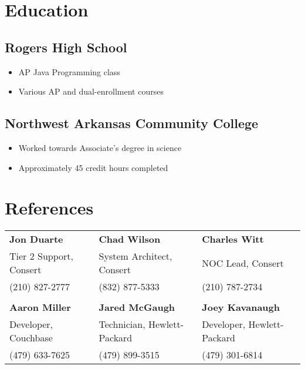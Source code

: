\documentclass[10pt]{article}
\begin{document}
\section*{Education}
\subsection*{Rogers High School}
\begin{itemize}
    \item AP Java Programming class
    \item Various AP and dual-enrollment courses
\end{itemize}

\subsection*{Northwest Arkansas Community College}
\begin{itemize}
    \item Worked towards Associate's degree in science
    \item Approximately 45 credit hours completed
\end{itemize}

\section*{References}
\begin{tabular}{l l l}
\textbf{Jon Duarte} & \textbf{Chad Wilson} & \textbf{Charles Witt} \\
Tier 2 Support, Consert & System Architect, Consert & NOC Lead, Consert\\
(210) 827-2777 & (832) 877-5333 & (210) 787-2734\\
\\
\textbf{Aaron Miller} & \textbf{Jared McGaugh} & \textbf{Joey Kavanaugh} \\
Developer, Couchbase & Technician, Hewlett-Packard & Developer, Hewlett-Packard\\
(479) 633-7625 & (479) 899-3515 & (479) 301-6814\\
\end{tabular}
\end{document}
